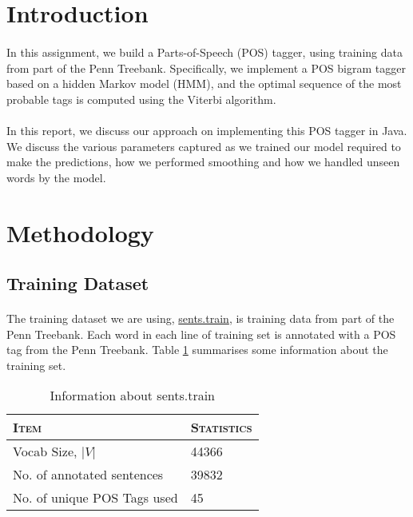 \documentclass[12pt]{article}
\begin{document}
\maketitle

\section{Introduction}
\paragraph{}
In this assignment, we build a Parts-of-Speech (POS) tagger, using training data from part of the Penn Treebank. Specifically, we implement a POS bigram tagger based on a hidden Markov model (HMM), and the optimal sequence of the most probable tags is computed using the Viterbi algorithm.

\paragraph{}
In this report, we discuss our approach on implementing this POS tagger in Java. We discuss the various parameters captured as we trained our model required to make the predictions, how we performed smoothing and how we handled unseen words by the model.

\section{Methodology}
\subsection{Training Dataset}
\paragraph{}
The training dataset we are using, \url{sents.train}, is training data from part of the Penn Treebank. Each word in each line of training set is annotated with a POS tag from the Penn Treebank. Table \ref{tab:sents_train} summarises some information about the training set.

\begin{table}[h]
	\center
	\begin{tabular}{ l l }
		\textsc{Item} & \textsc{Statistics}\\
		\hline
		Vocab Size, $|V|$ & 44366 \\
		No. of annotated sentences & 39832 \\
		No. of unique POS Tags used & 45 \\
	\end{tabular}
	\caption{Information about sents.train}
	\label{tab:sents_train}
\end{table}
\end{document}
